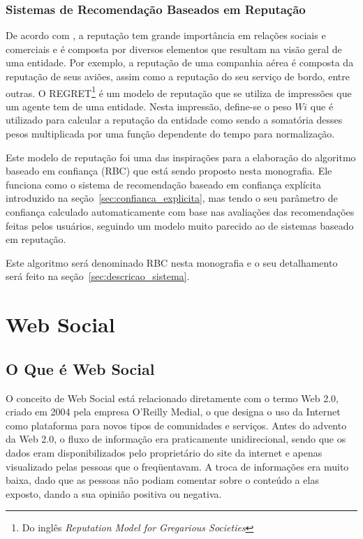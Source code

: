 \subsubsection{Sistemas de Recomendação Baseados em Reputação}
\label{sec:sistemas_de_recomendacao_baseados_em_reputacao}

De acordo com \cite{sabater2001regret}, a reputação tem grande importância em relações sociais e comerciais e é composta por diversos elementos que resultam na visão geral de uma entidade. Por exemplo, a reputação de uma companhia aérea é composta da reputação de seus aviões, assim como a reputação do seu serviço de bordo, entre outras. O REGRET\footnote{Do inglês \textit{Reputation Model for Gregarious Societies}} \cite{sabater2001regret} é um modelo de reputação que se utiliza de impressões que um agente tem de uma entidade. Nesta impressão, define-se o peso $W{i}$ que é utilizado para calcular a reputação da entidade como sendo a somatória desses pesos multiplicada por uma função dependente do tempo para normalização.

Este modelo de reputação foi uma das inspirações para a elaboração do algoritmo baseado em confiança (RBC) que está sendo proposto nesta monografia. Ele funciona como o sistema de recomendação baseado em confiança explícita introduzido na seção~\ref{sec:confianca_explicita}, mas tendo o seu parâmetro de confiança calculado automaticamente com base nas avaliações das recomendações feitas pelos usuários, seguindo um modelo muito parecido ao de sistemas baseado em reputação.

Este algoritmo será denominado RBC nesta monografia e o seu detalhamento será feito na seção~\ref{sec:descricao_sistema}.

\section{Web Social} %

\subsection{O Que é Web Social}

O conceito de Web Social está relacionado diretamente com o termo Web 2.0, criado em 2004 pela empresa O'Reilly Medial, o que designa o uso da Internet como plataforma para novos tipos de comunidades e serviços. Antes do advento da Web 2.0, o fluxo de informação era praticamente unidirecional, sendo que os dados eram disponibilizados pelo proprietário do site da internet e apenas visualizado pelas pessoas que o freqüentavam. A troca de informações era muito baixa, dado que as pessoas não podiam comentar sobre o conteúdo a elas exposto, dando a sua opinião positiva ou negativa.


